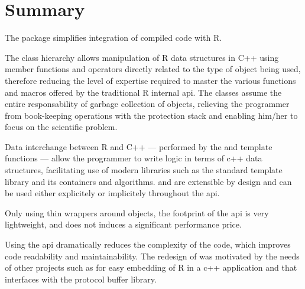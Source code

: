 \section{Summary}

The  package simplifies integration of compiled code
with R. 

The class hierarchy allows manipulation of R data structures in C++ 
using member functions and operators directly related to the type
of object being used, therefore reducing the level of expertise
required to master the various functions and macros offered by the
traditional R internal api. The classes assume the entire 
responsability of garbage collection of objects, relieving the 
programmer from book-keeping operations with the protection stack 
and enabling him/her to focus on the scientific problem. 

Data interchange between R and C++ --- performed by the 
 and  template functions --- allow the programmer
to write logic in terms of c++ data structures, facilitating use
of modern libraries such as the standard template library and its 
containers and algorithms.  and  are extensible
by design and can be used either explicitely or implicitely throughout 
the api. 

Only using thin wrappers around  objects, 
the footprint of the  api is very lightweight, and does not 
induces a significant performance price. 

Using the  api dramatically reduces the complexity 
of the code, which improves code readability and maintainability.
The redesign of  was motivated by the needs of other 
projects such as  for easy embedding 
of R in a c++ application and  that interfaces
with the protocol buffer library. 



\address{Dirk Eddelbuettel\\
  Debian Project\\
  Chicago, IL\\
  USA}\\

\address{Romain Fran\c{c}ois\\
  Professionnal R Enthusiast\\
  3 rue Emile Bonnet, 34 090 Montpellier\\
  FRANCE}\\


